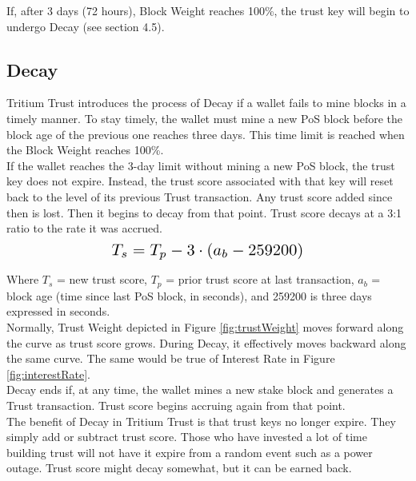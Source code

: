 \documentclass[11pt]{article}
\begin{document}
\noindent If, after 3 days (72 hours), Block Weight reaches 100\%, the trust key will begin to undergo Decay (see section 4.5).\\


\subsection{Decay}
Tritium Trust introduces the process of Decay if a wallet fails to mine blocks in a timely manner. To stay timely, the wallet must mine a new PoS block before the block age of the previous one reaches three days. This time limit is reached when the Block Weight reaches 100\%. \\

\noindent If the wallet reaches the 3-day limit without mining a new PoS block, the trust key does not expire. Instead, the trust score associated with that key will reset back to the level of its previous Trust transaction. Any trust score added since then is lost. Then it begins to decay from that point. Trust score decays at a 3:1 ratio to the rate it was accrued.\\

\begin{equation}
\resizebox{.50\hsize}{!}{$T_s = T_p - 3 \cdot (a_{b} - 259200)$}
\end{equation}

\noindent Where $T_s$ = new trust score, $T_p$ = prior trust score at last transaction, $a_{b}$ = block age (time since last PoS block, in seconds), and 259200 is three days expressed in seconds.\\

\noindent Normally, Trust Weight depicted in Figure \ref{fig:trustWeight} moves forward along the curve as trust score grows. During Decay, it effectively moves backward along the same curve. The same would be true of Interest Rate in Figure \ref{fig:interestRate}. \\

\noindent Decay ends if, at any time, the wallet mines a new stake block and generates a Trust transaction. Trust score begins accruing again from that point. \\

\noindent The benefit of Decay in Tritium Trust is that trust keys no longer expire. They simply add or subtract trust score. Those who have invested a lot of time building trust will not have it expire from a random event such as a power outage. Trust score might decay somewhat, but it can be earned back.\\
\end{document}
